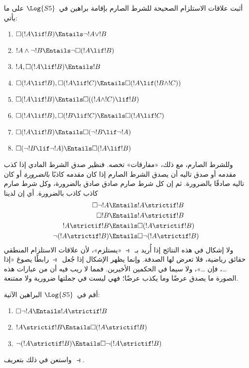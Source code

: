 \documentclass[../../../include/open-logic-section]{subfiles}
\begin{document}
\begin{prob}
  أثبت علاقات الاستلزام الصحيحة للشرط الصارم بإقامة براهين في~$\Log{S5}$
  على ما يأتي:
  \begin{enumerate}
  \item  $\Box(!A \lif !B) \Entails \lnot !A \lor !B$
  \item $!A \land \lnot !B \Entails \lnot\Box(!A \lif !B)$
  \item $!A, \Box(!A \lif !B) \Entails !B$
  \item $\Box(!A \lif !B), \Box(!A \lif !C) \Entails \Box(!A \lif (!B
    \land !C))$
  \item $\Box(!A \lif !B) \Entails \Box((!A \land !C) \lif !B)$
  \item $\Box(!A \lif !B), \Box(!B \lif !C) \Entails \Box(!A
    \lif !C)$
  \item $\Box(!A \lif !B) \Entails \Box(\lnot !B \lif \lnot !A)$
  \item $\Box(\lnot !B \lif \lnot !A) \Entails \Box(!A \lif !B)$
  \end{enumerate}
  \end{prob}

وللشرط الصارم، مع ذلك، «مفارقات» تخصه. فنظير صدق الشرط المادي إذا كذب
مقدمه أو صدق تاليه أن يصدق الشرط الصارم إذا كان مقدمه كاذبًا
\emph{بالضرورة} أو كان تاليه صادقًا بالضرورة. ثم إن كل شرط صارم صادق
صادق بالضرورة، وكل شرط صارم كاذب كاذب بالضرورة. أي إن لدينا
\begin{align}
  \Box \lnot !A & \Entails !A \strictif !B\\
  \Box !B & \Entails !A \strictif !B\\
  !A \strictif !B& \Entails \Box(!A \strictif !B)\\
  \lnot(!A \strictif !B) & \Entails \Box\lnot(!A \strictif !B)
\end{align}
ولا إشكال في هذه النتائج إذا أُريد بـ~$\strictif$ «يستلزم»، لأن علاقات
الاستلزام المنطقي حقائق رياضية، فلا تعرض لها الصدفة. وإنما يظهر الإشكال
إذا جُعل~$\strictif$ رابطًا يصوغ «إذا \dots، فإن \dots»، ولا سيما في
الحكمين الأخيرين. فمما لا ريب فيه أن من عبارات هذه الصورة ما يصدق عرضًا
وما يكذب عرضًا؛ فهي ليست في جملتها ضرورية ولا ممتنعة.

\begin{prob}
  أقم في~$\Log{S5}$ البراهين الآتية:
  \begin{enumerate}
    \item  $\Box \lnot !A \Entails !A \strictif !B$
    \item $!A \strictif !B \Entails \Box(!A \strictif !B)$
    \item $\lnot(!A \strictif !B)  \Entails \Box\lnot(!A \strictif !B)$
  \end{enumerate}
  واستعن في ذلك بتعريف~$\strictif$.
\end{prob}
\end{document}
